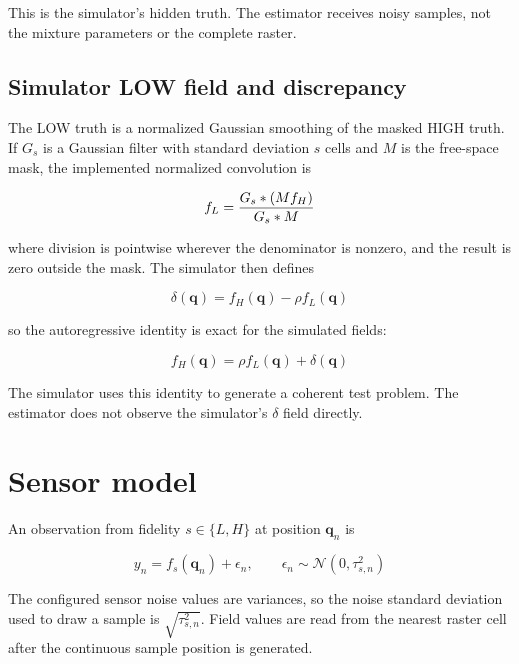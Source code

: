 \documentclass[11pt]{article}
\begin{document}
This is the simulator's hidden truth. The estimator receives noisy samples, not the mixture parameters or the complete raster.


\subsection{Simulator LOW field and discrepancy}


The LOW truth is a normalized Gaussian smoothing of the masked HIGH truth. If $G_s$ is a Gaussian filter with standard deviation $s$ cells and $M$ is the free-space mask, the implemented normalized convolution is


\begin{equation}
f_L \\
= \\
\frac{G_s * (M f_H)}{G_s * M}
\end{equation}


where division is pointwise wherever the denominator is nonzero, and the result is zero outside the mask. The simulator then defines


\begin{equation}
\delta(\mathbf q)=f_H(\mathbf q)-\rho f_L(\mathbf q)
\end{equation}


so the autoregressive identity is exact for the simulated fields:


\begin{equation}
f_H(\mathbf q)=\rho f_L(\mathbf q)+\delta(\mathbf q)
\end{equation}


The simulator uses this identity to generate a coherent test problem. The estimator does not observe the simulator's $\delta$ field directly.


\section{Sensor model}


An observation from fidelity $s\in\{L,H\}$ at position $\mathbf q_n$ is


\begin{equation}
y_n=f_s(\mathbf q_n)+\epsilon_n, \qquad
\epsilon_n\sim\mathcal N(0,\tau_{s,n}^2)
\end{equation}


The configured sensor noise values are variances, so the noise standard deviation used to draw a sample is $\sqrt{\tau_{s,n}^2}$. Field values are read from the nearest raster cell after the continuous sample position is generated.
\end{document}

